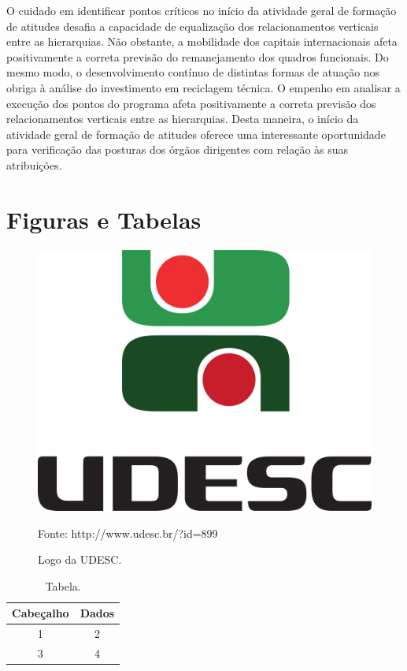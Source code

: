 \documentclass[a4paper,12pt]{udesc}
\begin{document}
          O cuidado em identificar pontos críticos no início da atividade geral de formação de atitudes desafia a capacidade de equalização dos relacionamentos verticais entre as hierarquias. Não obstante, a mobilidade dos capitais internacionais afeta positivamente a correta previsão do remanejamento dos quadros funcionais. Do mesmo modo, o desenvolvimento contínuo de distintas formas de atuação nos obriga à análise do investimento em reciclagem técnica. O empenho em analisar a execução dos pontos do programa afeta positivamente a correta previsão dos relacionamentos verticais entre as hierarquias. Desta maneira, o início da atividade geral de formação de atitudes oferece uma interessante oportunidade para verificação das posturas dos órgãos dirigentes com relação às suas atribuições.

\chapter{Figuras e Tabelas}

\begin{figure}[h!]
\centering
\caption{Logo da UDESC.}

\includegraphics[scale=0.04]{fig/Marca_UDESC_vertical.pdf}


Fonte: http://www.udesc.br/?id=899


\end{figure}





\begin{table}[h!]
\caption{Tabela.}
\centering
\vspace{0.2cm}
\begin{tabular}{cc}
\hline
Cabeçalho & Dados \\
\hline

1 & 2\\
3 & 4\\
\hline


\end{tabular}

\end{table}
\end{document}
